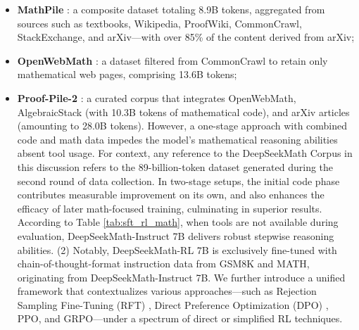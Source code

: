 \begin{itemize}[topsep=0pt]
    \item \textbf{MathPile} \citep{mathpile}: a composite dataset totaling 8.9B tokens, aggregated from sources such as textbooks, Wikipedia, ProofWiki, CommonCrawl, StackExchange, and arXiv—with over 85\% of the content derived from arXiv;
    \item \textbf{OpenWebMath} \citep{openwebmath}: a dataset filtered from CommonCrawl to retain only mathematical web pages, comprising 13.6B tokens;
    \item \textbf{Proof-Pile-2} \citep{llemma}: a curated corpus that integrates OpenWebMath, AlgebraicStack (with 10.3B tokens of mathematical code), and arXiv articles (amounting to 28.0B tokens). However, a one-stage approach with combined code and math data impedes the model’s mathematical reasoning abilities absent tool usage. For context, any reference to the DeepSeekMath Corpus in this discussion refers to the 89-billion-token dataset generated during the second round of data collection. In two-stage setups, the initial code phase contributes measurable improvement on its own, and also enhances the efficacy of later math-focused training, culminating in superior results. According to Table \ref{tab:sft_rl_math}, when tools are not available during evaluation, DeepSeekMath-Instruct 7B delivers robust stepwise reasoning abilities. (2) Notably, DeepSeekMath-RL 7B is exclusively fine-tuned with chain-of-thought-format instruction data from GSM8K and MATH, originating from DeepSeekMath-Instruct 7B. We further introduce a unified framework that contextualizes various approaches—such as Rejection Sampling Fine-Tuning (RFT) \citep{yuan2023scaling}, Direct Preference Optimization (DPO) \citep{dpo}, PPO, and GRPO—under a spectrum of direct or simplified RL techniques. \end{itemize}

